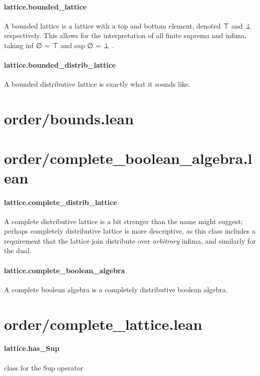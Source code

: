 \documentclass{article}
\begin{document}
\paragraph{lattice.bounded\_lattice}
\par
A bounded lattice is a lattice with a top and bottom element,
denoted 
\colorbox[RGB]{253,246,227}{{{{\color[RGB]{101, 123, 131} ⊤ }}}} and 
\colorbox[RGB]{253,246,227}{{{{\color[RGB]{101, 123, 131} ⊥ }}}} respectively. This allows for the interpretation
of all finite suprema and infima, taking 
\colorbox[RGB]{253,246,227}{{{{\color[RGB]{101, 123, 131} inf ∅  }}}{{{\color[RGB]{181, 137, 0} = }}}{{{\color[RGB]{101, 123, 131}  ⊤ }}}} and 
\colorbox[RGB]{253,246,227}{{{{\color[RGB]{101, 123, 131} sup ∅  }}}{{{\color[RGB]{181, 137, 0} = }}}{{{\color[RGB]{101, 123, 131}  ⊥ }}}}.
\paragraph{lattice.bounded\_distrib\_lattice}
\par
A bounded distributive lattice is exactly what it sounds like.
\section{order/bounds.lean}\section{order/complete\_boolean\_algebra.lean}\paragraph{lattice.complete\_distrib\_lattice}
\par
A complete distributive lattice is a bit stronger than the name might
suggest; perhaps completely distributive lattice is more descriptive,
as this class includes a requirement that the lattice join
distribute over 
\emph{arbitrary
} infima, and similarly for the dual.
\paragraph{lattice.complete\_boolean\_algebra}
\par
A complete boolean algebra is a completely distributive boolean algebra.
\section{order/complete\_lattice.lean}\paragraph{lattice.has\_Sup}
\par
class for the 
\colorbox[RGB]{253,246,227}{{{{\color[RGB]{101, 123, 131} Sup }}}} operator
\end{document}
